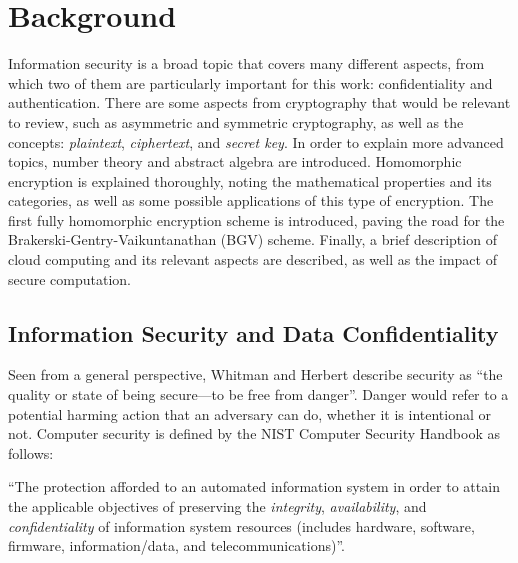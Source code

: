 \chapter{Background}
\label{background}

Information security is a broad topic that covers many different aspects, from which two of them are particularly important for this work: confidentiality and authentication. There are some aspects from cryptography that would be relevant to review, such as asymmetric and symmetric cryptography, as well as the concepts: \emph{plaintext}, \emph{ciphertext}, and \emph{secret key}. In order to explain more advanced topics, number theory and abstract algebra are introduced. Homomorphic encryption is explained thoroughly, noting the mathematical properties and its categories, as well as some possible applications of this type of encryption. The first fully homomorphic encryption scheme is introduced, paving the road for the Brakerski-Gentry-Vaikuntanathan (BGV) scheme. Finally, a brief description of cloud computing and its relevant aspects are described, as well as the impact of secure computation.

\section{Information Security and Data Confidentiality}

Seen from a general perspective, Whitman and Herbert \cite{PrinciplesInformationSecurity} describe security as ``the quality or state of being secure---to be free from danger''. Danger would refer to a potential harming action that an adversary can do, whether it is intentional or not. Computer security is defined by the NIST Computer Security Handbook \cite{NIST95} as follows:

``The protection afforded to an automated information system in order to attain the applicable objectives of preserving the \emph{integrity}, \emph{availability}, and \emph{confidentiality} of information system resources (includes hardware, software, firmware, information/data, and telecommunications)''.

